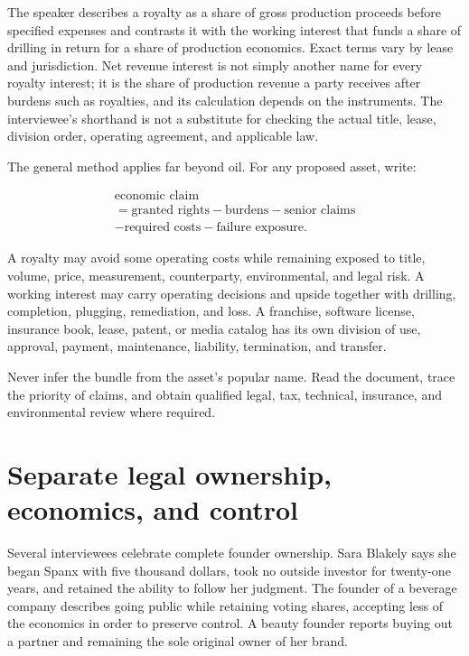 The speaker describes a royalty as a share of gross production proceeds before
specified expenses and contrasts it with the working interest that funds a
share of drilling in return for a share of production economics. Exact terms
vary by lease and jurisdiction. Net revenue interest is not simply another
name for every royalty interest; it is the share of production revenue a party
receives after burdens such as royalties, and its calculation depends on the
instruments. The interviewee's shorthand is not a substitute for checking the
actual title, lease, division order, operating agreement, and applicable law.

The general method applies far beyond oil. For any proposed asset, write:

\begin{equation}
\begin{gathered}
\text{economic claim}\\
=\text{granted rights}-\text{burdens}-\text{senior claims}\\
-\text{required costs}-\text{failure exposure}.
\end{gathered}
\end{equation}

A royalty may avoid some operating costs while remaining exposed to title,
volume, price, measurement, counterparty, environmental, and legal risk. A
working interest may carry operating decisions and upside together with
drilling, completion, plugging, remediation, and loss. A franchise, software
license, insurance book, lease, patent, or media catalog has its own division
of use, approval, payment, maintenance, liability, termination, and transfer.

Never infer the bundle from the asset's popular name. Read the document, trace
the priority of claims, and obtain qualified legal, tax, technical, insurance,
and environmental review where required.

\section[Legal ownership and control]{Separate legal ownership, economics, and control}

Several interviewees celebrate complete founder ownership. Sara Blakely says
she began Spanx with five thousand dollars, took no outside investor for
twenty-one years, and retained the ability to follow her judgment. The founder
of a beverage company describes going public while retaining voting shares,
accepting less of the economics in order to preserve control. A beauty founder
reports buying out a partner and remaining the sole original owner of her
brand.

